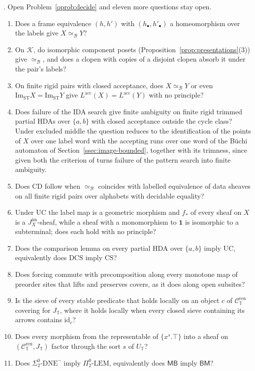 \documentclass{lmcs}
\theoremstyle{definition}
\theoremstyle{remark}
\newcommand{\Tt}{\mathbb{T}}
\newcommand{\ab}{\{a,b\}}
\newcommand{\prin}[1]{\mathrm{#1}}
\newcommand{\UC}{\prin{UC}}
\newcommand{\CD}{\prin{CD}}
\newcommand{\Csyn}[1]{\mathcal{C}^{\mathrm{ren}}_{#1}}
\newcommand{\Jsyn}[1]{J_{#1}}
\providecommand{\SDNE}{\Sigma^0_2\text{-}\prin{DNE}^{\neg}}
\providecommand{\PLEM}{\Pi^0_2\text{-}\prin{LEM}}
\providecommand{\MinB}{\mathsf{MB}}
\providecommand{\BinM}{\mathsf{BM}}
\providecommand{\LangA}[1]{L^{\mathrm{acc}}(#1)}
\providecommand{\Cls}{\mathcal{K}}
\providecommand{\eqB}{\simeq_{\mathcal{B}}}
\providecommand{\fsh}{f_{\ast}}
\providecommand{\ImaST}{\mathrm{Im}_{\mathrm{ST}}}
\providecommand{\Jim}[1]{J^{\mathrm{im}}_{#1}}
\providecommand{\CS}{\prin{CS}}
\providecommand{\DCS}{\prin{DCS}}
\providecommand{\SDNE}{\Sigma^0_2\text{-}\prin{DNE}^{\neg}}
\providecommand{\PLEM}{\Pi^0_2\text{-}\prin{LEM}}
\begin{document}
\cite{BBEP}. Open Problem~\ref{oprob:decide} and eleven more questions stay
open.
\begin{enumerate}[label=(\arabic*),leftmargin=*,nosep]
\item Does a frame equivalence $(h,h')$ with $(h_\bullet,h'_\bullet)$ a homeomorphism over the labels give
  $X\eqB Y$?
\item On $\Cls$, do isomorphic component posets (Proposition~\ref{prop:presentations}(3)) give $\eqB$, and does a
  clopen with copies of a disjoint clopen absorb it under the pair's labels?
\item On finite rigid pairs with closed acceptance, does $X\eqB Y$ or even $\ImaST X=\ImaST Y$ give
  $\LangA{X}=\LangA{Y}$ with no principle?
\item Does failure of the IDA search give finite ambiguity on finite rigid trimmed partial HDAs over $\ab$ with
  closed acceptance outside the cycle class? Under
  excluded middle the question reduces to the identification of the points of $X$ over one label word with the accepting
  runs over one word of the B\"uchi automaton of Section~\ref{ssec:image-bounded}, together with its trimness, since
  given both the criterion of \cite{LP18} turns failure of the
  pattern search into finite ambiguity.
\item Does $\CD$ follow when $\eqB$ coincides with labelled equivalence of data sheaves on all finite rigid pairs over
  alphabets with decidable equality?
\item Under $\UC$ the label map is a geometric morphism and $\fsh$ of every sheaf on $X$ is a $\Jim{X}$-sheaf, while a sheaf
  with a monomorphism to $\mathbf{1}$ is isomorphic to a subterminal; does each hold with no principle?
\item Does the comparison lemma on every partial HDA over $\ab$ imply $\UC$, equivalently does $\DCS$ imply
  $\CS$?
\item Does forcing commute with precomposition along every monotone map of preorder sites that lifts and preserves
  covers, as it does along open subsites?
\item Is the sieve of every stable predicate that holds locally on an object $c$ of $\Csyn{\Tt}$ covering for
  $\Jsyn{\Tt}$, where it holds locally when every closed sieve containing its arrows contains $\mathrm{id}_c$?
\item Does every morphism from the representable of $\{x^s.\top\}$ into a sheaf on $(\Csyn{\Tt},\Jsyn{\Tt})$ factor
  through the sort $s$ of $U_{\Tt}$?
\item Does $\SDNE$ imply $\PLEM$, equivalently does $\MinB$ imply $\BinM$?
\end{enumerate}
\end{document}
